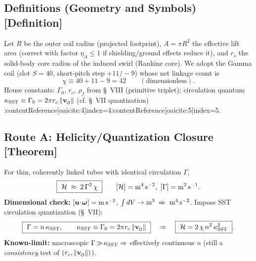 \documentclass[10pt,reprint,aps,onecolumn,nofootinbib]{revtex4-2}
\newcommand{\vnorm}{\lVert \mathbf{v}_{\mkern-2mu\scriptscriptstyle\boldsymbol{\circlearrowleft}} \rVert}               %
\newcommand{\rc}{r_c}                                    %
\providecommand{\rc}{r_c}
\newcommand{\rhoF}{\rho_{\!f}}     %
\begin{document}
    \subsection{Definitions (Geometry and Symbols) [Definition]}
        \label{subsec:GammaDefs}
        Let $R$ be the outer coil radius (projected footprint), $A=\pi R^2$ the effective lift area (correct with factor $\eta_A\le 1$ if shielding/ground effects reduce it), and $r_s$ the solid-body core radius of the induced swirl (Rankine core). We adopt the Gamma coil (slot $S=40$, short-pitch step $+11/-9$) whose net linkage count is
        \[
            \chi \equiv 40+11-9=42\qquad(\text{dimensionless}).
        \]
        House constants: $\Gamma_0$, $\rc$, $\rhoF$ from \S~VIII (primitive triplet); circulation quantum $\kappa_{\rm SST} \equiv \Gamma_0 = 2\pi \rc\,\vnorm$ (cf. \S~VII quantization) :contentReference[oaicite:4]{index=4}:contentReference[oaicite:5]{index=5}.

    \subsection{Route A: Helicity/Quantization Closure [Theorem]}
        \label{subsec:HelicityRoute}
        For thin, coherently linked tubes with identical circulation $\Gamma$,
        \begin{equation}
        \boxed{\ \mathcal{H} \;\approx\; 2\,\Gamma^{2}\, \chi\ }\qquad [\mathcal{H}]={\rm m^4\,s^{-2}},\ [\Gamma]={\rm m^2\,s^{-1}}.
        \end{equation}
        \textbf{Dimensional check:} $[\mathbf{u}\!\cdot\!\boldsymbol{\omega}]={\rm m\,s^{-2}}$, $\int dV\to{\rm m^3}$ $\Rightarrow\ {\rm m^4\,s^{-2}}$.
        Impose SST circulation quantization (\S~VII):
        \begin{equation}
        \boxed{\ \Gamma = n\,\kappa_{\rm SST},\qquad \kappa_{\rm SST} \equiv \Gamma_0 = 2\pi \rc\,\vnorm\ }\quad\Rightarrow\quad
        \boxed{\ \mathcal{H}=2\,\chi\,n^2\,\kappa_{\rm SST}^{2}\ }.
        \end{equation}
        \textbf{Known-limit:} macroscopic $\Gamma\!\gg\!\kappa_{\rm SST}\Rightarrow$ effectively continuous $n$ (still a \emph{consistency} test of $(\rc,\vnorm)$).
\end{document}
